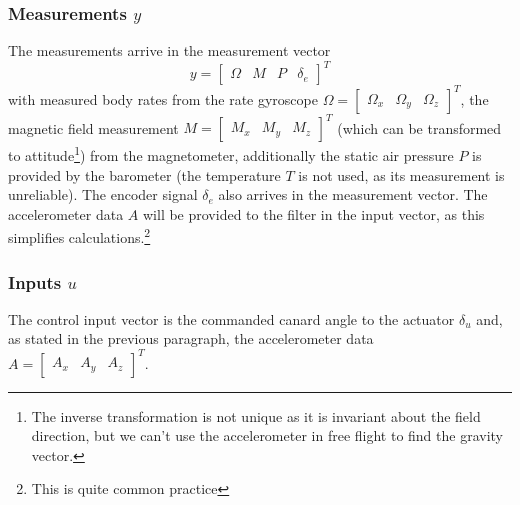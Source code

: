 \subsubsection{Measurements $y$}
The measurements arrive in the measurement vector 
\begin{equation}
    y =  \begin{bmatrix}
    \Omega & M & P & \delta_e
    \end{bmatrix}^T
\end{equation}
with measured body rates from the rate gyroscope $\Omega = \begin{bmatrix} \Omega_x & \Omega_y & \Omega_z \end{bmatrix}^T$, the magnetic field measurement $M = \begin{bmatrix} M_x & M_y & M_z \end{bmatrix}^T$ (which can be transformed to attitude\footnote{The inverse transformation is not unique as it is invariant about the field direction, but we can’t use the accelerometer in free flight to find the gravity vector.}) from the magnetometer, additionally the static air pressure $P$ is provided by the barometer (the temperature $T$ is not used, as its measurement is unreliable).
The encoder signal $\delta_e$ also arrives in the measurement vector.
The accelerometer data $A$ will be provided to the filter in the input vector, as this simplifies calculations.\footnote{This is quite common practice}

\subsubsection{Inputs $u$}
The control input vector is the commanded canard angle to the actuator $\delta_u$ and, as stated in the previous paragraph, the  accelerometer data $A = \begin{bmatrix} A_x & A_y & A_z \end{bmatrix}^T$. %

